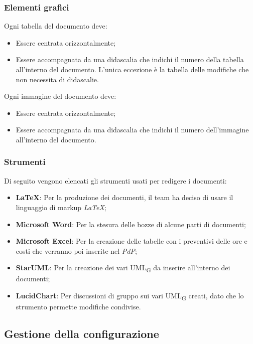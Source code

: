 \subsubsection{Elementi grafici}

Ogni tabella del documento deve:
\begin{itemize}
\item Essere centrata orizzontalmente;
\item Essere accompagnata da una didascalia che indichi il numero della tabella all'interno del documento. L'unica eccezione è la tabella delle modifiche che non necessita di didascalie.
\end{itemize}

Ogni immagine del documento deve:
\begin{itemize}
\item Essere centrata orizzontalmente;
\item Essere accompagnata da una didascalia che indichi il numero dell'immagine all'interno del documento.
\end{itemize}

\subsubsection{Strumenti}
Di seguito vengono elencati gli strumenti usati per redigere i documenti:
\begin{itemize}
\item \textbf{\LaTeX}: Per la produzione dei documenti, il team ha deciso di usare il linguaggio di markup \textit{\LaTeX};
\item \textbf{Microsoft Word}: Per la stesura delle bozze di alcune parti di documenti;
\item \textbf{Microsoft Excel}: Per la creazione delle tabelle con i preventivi delle ore e costi che verranno poi inserite nel \textit{PdP};
\item \textbf{StarUML}: Per la creazione dei vari UML\textsubscript{G} da inserire all'interno dei documenti;
\item \textbf{LucidChart}: Per discussioni di gruppo sui vari UML\textsubscript{G} creati, dato che lo strumento permette modifiche condivise.
\end{itemize}


\subsection{Gestione della configurazione}

